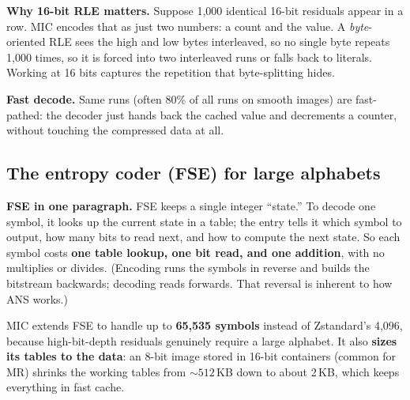 \documentclass[journal]{IEEEtran}
\begin{document}
\textbf{Why 16-bit RLE matters.} Suppose 1,000 identical 16-bit residuals
appear in a row. MIC encodes that as just two numbers: a count and the value.
A \emph{byte}-oriented RLE sees the high and low bytes interleaved, so no
single byte repeats 1,000 times, so it is forced into two interleaved runs or
falls back to literals. Working at 16 bits captures the repetition that
byte-splitting hides.

\textbf{Fast decode.} Same runs (often 80\% of all runs on smooth images) are
fast-pathed: the decoder just hands back the cached value and decrements a
counter, without touching the compressed data at all.

\subsection{The entropy coder (FSE) for large alphabets}

\textbf{FSE in one paragraph.} FSE keeps a single integer ``state.'' To decode
one symbol, it looks up the current state in a table; the entry tells it which
symbol to output, how many bits to read next, and how to compute the next
state. So each symbol costs \textbf{one table lookup, one bit read, and one
addition}, with no multiplies or divides. (Encoding runs the symbols in reverse
and builds the bitstream backwards; decoding reads forwards. That reversal is
inherent to how ANS works.)

MIC extends FSE to handle up to \textbf{65,535 symbols} instead of Zstandard's
4,096, because high-bit-depth residuals genuinely require a large alphabet. It
also \textbf{sizes its tables to the data}: an 8-bit image stored in 16-bit
containers (common for MR) shrinks the working tables from ${\sim}512$\,KB down
to about 2\,KB, which keeps everything in fast cache.
\end{document}

